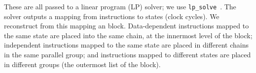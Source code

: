 These are all passed to a linear program (LP)
solver; we use \texttt{lp\_solve}~\cite{berkelaar10}.
The solver outputs a mapping from instructions to states (clock
cycles). We reconstruct from this mapping an \rtlpar{}
block. Data-dependent instructions mapped to the same state are placed
into the same chain, at the innermost level of the \rtlpar{} block; independent
instructions mapped to the same state are placed in different chains in
the same parallel group; and instructions mapped to different states
are placed in different groups (the outermost list of the \rtlpar{}
block).




